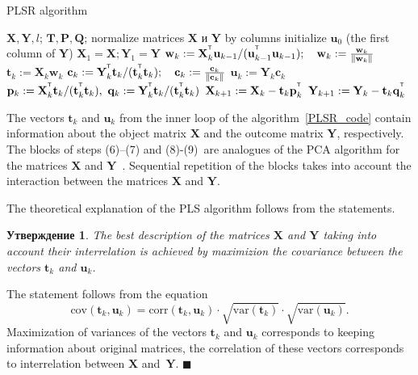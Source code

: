 \documentclass[12pt,twoside]{article}
\newtheorem{statement}{Утверждение}
\newcommand{\bw}{\mathbf{w}}
\newcommand{\bY}{\mathbf{Y}}
\newcommand{\bX}{\mathbf{X}}
\newcommand{\bu}{\mathbf{u}}
\newcommand{\bt}{\mathbf{t}}
\newcommand{\bp}{\mathbf{p}}
\newcommand{\bq}{\mathbf{q}}
\newcommand{\bc}{\mathbf{c}}
\newcommand{\bP}{\mathbf{P}}
\newcommand{\bT}{\mathbf{T}}
\newcommand{\bQ}{\mathbf{Q}}
\newcommand{\T}{^{\text{\tiny\sffamily\upshape\mdseries T}}}
\begin{document}
\begin{algorithm}[h]
\caption{PLSR algorithm}
\label{PLSR_code}
\begin{algorithmic}[1]
	\REQUIRE $\bX, \bY, l$;
	\ENSURE $\bT, \bP, \bQ$;
	\STATE normalize matrices $\bX$ и $\bY$ by columns
	\STATE initialize $\bu_0$ (the first column of $\bY$)
	\STATE $\bX_1 = \bX; \bY_1 = \bY$
	\REPEAT
	\vspace{0.1cm}
	\STATE $\bw_k := \bX_k^{\T} \bu_{k-1} / (\bu_{k-1}^{\T} \bu_{k-1}); \quad \bw_k: = \frac{\bw_k}{\| \bw_k \|}$
	\vspace{0.1cm}
	\STATE $\bt_k := \bX_k \bw_k$
	\vspace{0.1cm}
	\STATE $\bc_k := \bY_k^{\T} \bt_k / (\bt_k^{\T} \bt_k); \quad \bc_k: = \frac{\bc_k}{\| \bc_k \|}$
	\vspace{0.1cm}
	\STATE $\bu_k := \bY_k \bc_k$
	\UNTIL{$\bt_k$ stabilizes}
	\vspace{0.1cm}
	\STATE $\bp_k:= \bX_k^{\T}\bt_k/(\bt_k^{\T}\bt_k),\ 
	\bq_k := \bY_k^{\T}\bt_k/(\bt_k^{\T}\bt_k)$
	\vspace{0.2cm}
	\STATE $\bX_{k+1} :=  \bX_k - \bt_k \bp_k^{\T}$
	\vspace{0.2cm}
	\STATE $\bY_{k + 1} :=  \bY_k - \bt_k \bq_k^{\T}$ 
	\ENDFOR
\end{algorithmic}
\end{algorithm}

The vectors $\bt_k$ and $\bu_k$ from the inner loop of the algorithm~\ref{PLSR_code} contain information about the object matrix $\bX$ and the outcome matrix $\bY$, respectively. 
The blocks of steps (6)--(7) and (8)-(9)~are analogues of the PCA algorithm for the matrices $\bX$ and $\bY$~\cite{geladi1986partial}. 
Sequential repetition of the blocks takes into account the interaction between the matrices $\bX$ and $\bY$.

The theoretical explanation of the PLS algorithm follows from the statements.
\begin{statement}
The best description of the matrices $\bX$ and $\bY$ taking into account their interrelation is achieved by maximizion the covariance between the vectors $\bt_k$ and $\bu_k$.
\end{statement}
The statement follows from the equation
\[
\text{cov} (\bt_k, \bu_k) = \text{corr} (\bt_k, \bu_k) \cdot \sqrt{\text{var}(\bt_k)} \cdot \sqrt{\text{var}(\bu_k)}.
\]
Maximization of variances of the vectors $\bt_k$ and $\bu_k$ corresponds to keeping information about original matrices, the correlation of these vectors corresponds to interrelation between $\bX$ and~$\bY$. $\blacksquare$
\end{document}
